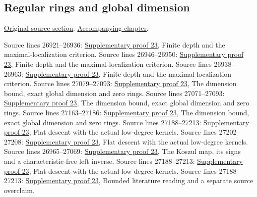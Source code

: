 \subsection{Regular rings and global dimension}
\hypertarget{algebra-source-section-regular-finite-gl-dim}{}
\noindent\href{https://github.com/stacks/stacks-project/blob/a04446e57ec1fbc252a871afcec7752fb2807b14/algebra.tex\#L26914}{Original source section}. \href{algebra.pdf\#nameddest=section-regular-finite-gl-dim}{Accompanying chapter}.

\begin{AlgebraSourceRoutes}
 Source lines 26921--26936: \hyperlink{algebra_regular_ab_notes_20260928}{Supplementary proof 23}, Finite depth and the maximal-localization criterion.
 Source lines 26946--26950: \hyperlink{algebra_regular_ab_notes_20260928}{Supplementary proof 23}, Finite depth and the maximal-localization criterion.
 Source lines 26938--26963: \hyperlink{algebra_regular_ab_notes_20260928}{Supplementary proof 23}, Finite depth and the maximal-localization criterion.
 Source lines 27079--27093: \hyperlink{algebra_regular_ab_notes_20260928}{Supplementary proof 23}, The dimension bound, exact global dimension and zero rings.
 Source lines 27071--27093: \hyperlink{algebra_regular_ab_notes_20260928}{Supplementary proof 23}, The dimension bound, exact global dimension and zero rings.
 Source lines 27163--27186: \hyperlink{algebra_regular_ab_notes_20260928}{Supplementary proof 23}, The dimension bound, exact global dimension and zero rings.
 Source lines 27188--27213: \hyperlink{algebra_regular_ab_notes_20260928}{Supplementary proof 23}, Flat descent with the actual low-degree kernels.
 Source lines 27202--27208: \hyperlink{algebra_regular_ab_notes_20260928}{Supplementary proof 23}, Flat descent with the actual low-degree kernels.
 Source lines 26965--27069: \hyperlink{algebra_regular_ab_notes_20260928}{Supplementary proof 23}, The Koszul map, its signs and a characteristic-free left inverse.
 Source lines 27188--27213: \hyperlink{algebra_regular_ab_notes_20260928}{Supplementary proof 23}, Flat descent with the actual low-degree kernels.
 Source lines 27188--27213: \hyperlink{algebra_regular_ab_notes_20260928}{Supplementary proof 23}, Bounded literature reading and a separate source overclaim.
\end{AlgebraSourceRoutes}

